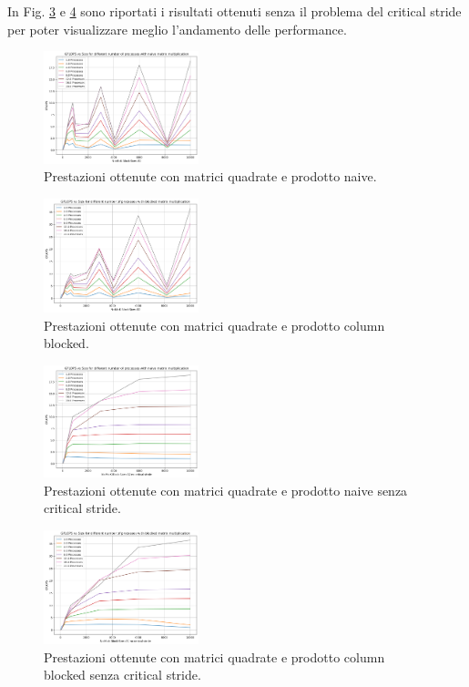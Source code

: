 \documentclass[conference]{IEEEtran}
\begin{document}
In Fig. \ref{fig:square_matrix_naive_nocrit} e \ref{fig:square_matrix_blocked_nocrit} sono riportati i risultati ottenuti senza il problema del critical stride per poter visualizzare meglio l'andamento delle performance.
\begin{figure}[H]
    \centering
    \includegraphics[width=0.4\textwidth]{resources/quadrate_naive.png}
    \caption{Prestazioni ottenute con matrici quadrate e prodotto naive.}
    \label{fig:square_matrix_naive}
\end{figure}
\begin{figure}[H]
    \centering
    \includegraphics[width=0.4\textwidth]{resources/quadrate_blocked.png}
    \caption{Prestazioni ottenute con matrici quadrate e prodotto column blocked.}
    \label{fig:square_matrix_blocked}
\end{figure}
\begin{figure}[H]
    \centering
    \includegraphics[width=0.4\textwidth]{resources/square_naive_nocrit.png}
    \caption{Prestazioni ottenute con matrici quadrate e prodotto naive senza critical stride.}
    \label{fig:square_matrix_naive_nocrit}
\end{figure}
\begin{figure}[H]
    \centering
    \includegraphics[width=0.4\textwidth]{resources/square_blocked_nocrit.png}
    \caption{Prestazioni ottenute con matrici quadrate e prodotto column blocked senza critical stride.}
    \label{fig:square_matrix_blocked_nocrit}
\end{figure}
\end{document}
